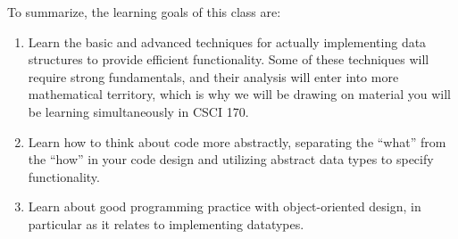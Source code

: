 To summarize, the learning goals of this class are:
\begin{enumerate}
\item Learn the basic and advanced techniques for actually
  implementing data structures to provide efficient functionality.
  Some of these techniques will require strong fundamentals,
  and their analysis will enter into more mathematical territory,
  which is why we will be drawing on material you will be learning
  simultaneously in CSCI 170.
\item Learn how to think about code more abstractly, separating the
  ``what'' from the ``how'' in your code design and utilizing abstract
  data types to specify functionality.
\item Learn about good programming practice with object-oriented
  design, in particular as it relates to implementing datatypes.
\end{enumerate}
